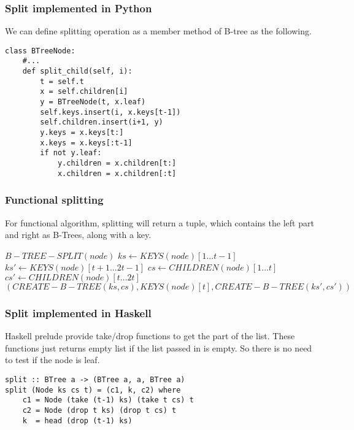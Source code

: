 \documentclass{article}
\begin{document}
\subsubsection*{Split implemented in Python}
We can define splitting operation as a member method of B-tree
as the following.

\lstset{language=Python}
\begin{lstlisting}
class BTreeNode:
    #...
    def split_child(self, i):
        t = self.t
        x = self.children[i]
        y = BTreeNode(t, x.leaf)
        self.keys.insert(i, x.keys[t-1])
        self.children.insert(i+1, y)
        y.keys = x.keys[t:]
        x.keys = x.keys[:t-1]
        if not y.leaf:
            y.children = x.children[t:]
            x.children = x.children[:t]
\end{lstlisting}

\subsubsection{Functional splitting}

For functional algorithm, splitting will return a tuple, which contains the
left part and right as B-Trees, along with a key.

\begin{algorithmic}
\STATE $B-TREE-SPLIT(node)$
  \STATE $ks \leftarrow KEYS(node)[1 ... t-1]$
  \STATE $ks' \leftarrow KEYS(node)[t+1 ... 2t-1]$
    \STATE $cs \leftarrow CHILDREN(node)[1 ... t]$
    \STATE $cs' \leftarrow CHILDREN(node)[t ... 2t]$
  \ENDIF
  \RETURN $(CREATE-B-TREE(ks, cs), KEYS(node)[t], CREATE-B-TREE(ks', cs'))$
\end{algorithmic}

\subsubsection*{Split implemented in Haskell}
Haskell prelude provide take/drop functions to get the part
of the list. These functions just returns empty list if the 
list passed in is empty. So there is no need to test if
the node is leaf.

\lstset{language=Haskell}
\begin{lstlisting}
split :: BTree a -> (BTree a, a, BTree a)
split (Node ks cs t) = (c1, k, c2) where
    c1 = Node (take (t-1) ks) (take t cs) t
    c2 = Node (drop t ks) (drop t cs) t
    k  = head (drop (t-1) ks)
\end{lstlisting}
\end{document}
